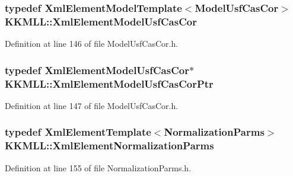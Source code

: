 \subsubsection[{\texorpdfstring{Xml\+Element\+Model\+Usf\+Cas\+Cor}{XmlElementModelUsfCasCor}}]{\setlength{\rightskip}{0pt plus 5cm}typedef {\bf Xml\+Element\+Model\+Template}$<${\bf Model\+Usf\+Cas\+Cor}$>$ {\bf K\+K\+M\+L\+L\+::\+Xml\+Element\+Model\+Usf\+Cas\+Cor}}\hypertarget{namespace_k_k_m_l_l_aec7e6afb46ad7bf004a01e681f738bf6}{}\label{namespace_k_k_m_l_l_aec7e6afb46ad7bf004a01e681f738bf6}


Definition at line 146 of file Model\+Usf\+Cas\+Cor.\+h.

\subsubsection[{\texorpdfstring{Xml\+Element\+Model\+Usf\+Cas\+Cor\+Ptr}{XmlElementModelUsfCasCorPtr}}]{\setlength{\rightskip}{0pt plus 5cm}typedef {\bf Xml\+Element\+Model\+Usf\+Cas\+Cor}$\ast$ {\bf K\+K\+M\+L\+L\+::\+Xml\+Element\+Model\+Usf\+Cas\+Cor\+Ptr}}\hypertarget{namespace_k_k_m_l_l_a38483eb9f1d416374bb489ca2488aa77}{}\label{namespace_k_k_m_l_l_a38483eb9f1d416374bb489ca2488aa77}


Definition at line 147 of file Model\+Usf\+Cas\+Cor.\+h.

\subsubsection[{\texorpdfstring{Xml\+Element\+Normalization\+Parms}{XmlElementNormalizationParms}}]{\setlength{\rightskip}{0pt plus 5cm}typedef {\bf Xml\+Element\+Template}$<${\bf Normalization\+Parms}$>$ {\bf K\+K\+M\+L\+L\+::\+Xml\+Element\+Normalization\+Parms}}\hypertarget{namespace_k_k_m_l_l_a80999ab5f8f5e6283564544d2ce63d92}{}\label{namespace_k_k_m_l_l_a80999ab5f8f5e6283564544d2ce63d92}


Definition at line 155 of file Normalization\+Parms.\+h.

